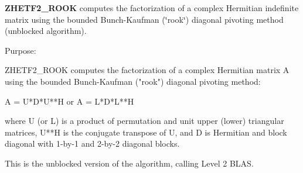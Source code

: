 {\bfseries Z\+H\+E\+T\+F2\+\_\+\+R\+O\+O\+K} computes the factorization of a complex Hermitian indefinite matrix using the bounded Bunch-\/\+Kaufman (\char`\"{}rook\char`\"{}) diagonal pivoting method (unblocked algorithm). 

 \begin{DoxyParagraph}{Purpose\+: }
\begin{DoxyVerb} ZHETF2_ROOK computes the factorization of a complex Hermitian matrix A
 using the bounded Bunch-Kaufman ("rook") diagonal pivoting method:

    A = U*D*U**H  or  A = L*D*L**H

 where U (or L) is a product of permutation and unit upper (lower)
 triangular matrices, U**H is the conjugate transpose of U, and D is
 Hermitian and block diagonal with 1-by-1 and 2-by-2 diagonal blocks.

 This is the unblocked version of the algorithm, calling Level 2 BLAS.\end{DoxyVerb}
 
\end{DoxyParagraph}

